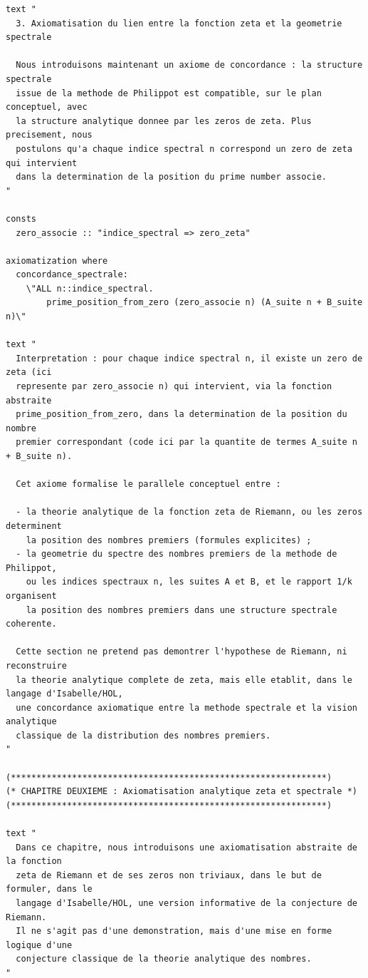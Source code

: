 \documentclass[a4paper,11pt]{article}
\begin{document}
\begin{holcode}[title={\textcolor{white}{File: methode\_spectral.thy -- Part 6/6 (END)}}]
\begin{lstlisting}
text "
  3. Axiomatisation du lien entre la fonction zeta et la geometrie spectrale

  Nous introduisons maintenant un axiome de concordance : la structure spectrale
  issue de la methode de Philippot est compatible, sur le plan conceptuel, avec
  la structure analytique donnee par les zeros de zeta. Plus precisement, nous
  postulons qu'a chaque indice spectral n correspond un zero de zeta qui intervient
  dans la determination de la position du prime number associe.
"

consts
  zero_associe :: "indice_spectral => zero_zeta"

axiomatization where
  concordance_spectrale:
    \"ALL n::indice_spectral.
        prime_position_from_zero (zero_associe n) (A_suite n + B_suite n)\"

text "
  Interpretation : pour chaque indice spectral n, il existe un zero de zeta (ici
  represente par zero_associe n) qui intervient, via la fonction abstraite
  prime_position_from_zero, dans la determination de la position du nombre
  premier correspondant (code ici par la quantite de termes A_suite n + B_suite n).

  Cet axiome formalise le parallele conceptuel entre :

  - la theorie analytique de la fonction zeta de Riemann, ou les zeros determinent
    la position des nombres premiers (formules explicites) ;
  - la geometrie du spectre des nombres premiers de la methode de Philippot,
    ou les indices spectraux n, les suites A et B, et le rapport 1/k organisent
    la position des nombres premiers dans une structure spectrale coherente.

  Cette section ne pretend pas demontrer l'hypothese de Riemann, ni reconstruire
  la theorie analytique complete de zeta, mais elle etablit, dans le langage d'Isabelle/HOL,
  une concordance axiomatique entre la methode spectrale et la vision analytique
  classique de la distribution des nombres premiers.
"

(**************************************************************)
(* CHAPITRE DEUXIEME : Axiomatisation analytique zeta et spectrale *)
(**************************************************************)

text "
  Dans ce chapitre, nous introduisons une axiomatisation abstraite de la fonction
  zeta de Riemann et de ses zeros non triviaux, dans le but de formuler, dans le
  langage d'Isabelle/HOL, une version informative de la conjecture de Riemann.
  Il ne s'agit pas d'une demonstration, mais d'une mise en forme logique d'une
  conjecture classique de la theorie analytique des nombres.
"


\end{lstlisting}
\end{holcode}
\end{document}
